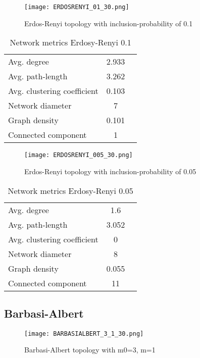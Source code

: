 \documentclass[Bachelorarbeit.tex]{subfiles}
\begin{document}
\begin{figure}[H]
	\centering
  \texttt{[image: ERDOSRENYI\_01\_30.png]}
	\caption{Erdos-Renyi topology with inclusion-probability of 0.1}
	\label{fig1}
\end{figure}

\begin{table}[h]
	\centering
	\caption{Network metrics Erdosy-Renyi 0.1}
	\begin{tabular} { l c r }
		\hline
		Avg. degree & 2.933 \\
		Avg. path-length & 3.262 \\
		Avg. clustering coefficient & 0.103 \\
		Network diameter & 7 \\
		Graph density & 0.101 \\
		Connected component & 1 \\
		\hline
	\end{tabular}
\end{table}


\begin{figure}[H]
	\centering
  \texttt{[image: ERDOSRENYI\_005\_30.png]}
	\caption{Erdos-Renyi topology with inclusion-probability of 0.05}
	\label{fig1}
\end{figure}

\begin{table}[h]
	\centering
	\caption{Network metrics Erdosy-Renyi 0.05}
	\begin{tabular} { l c r }
		\hline
		Avg. degree & 1.6 \\
		Avg. path-length & 3.052 \\
		Avg. clustering coefficient & 0 \\
		Network diameter & 8 \\
		Graph density & 0.055 \\
		Connected component & 11 \\
		\hline
	\end{tabular}
\end{table}

\subsection{Barbasi-Albert}
\begin{figure}[H]
	\centering
  \texttt{[image: BARBASIALBERT\_3\_1\_30.png]}
	\caption{Barbasi-Albert topology with m0=3, m=1}
	\label{fig1}
\end{figure}
\end{document}
